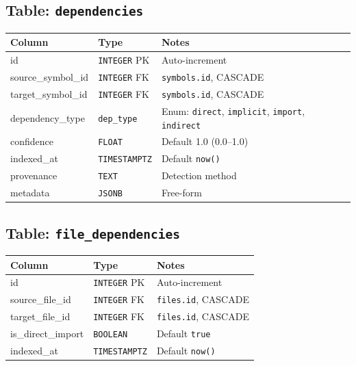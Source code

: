 \subsection{Table: \texttt{dependencies}}

\begin{longtable}{@{}llp{6cm}@{}}
\toprule
\textbf{Column} & \textbf{Type} & \textbf{Notes} \\
\midrule
\endfirsthead
\bottomrule
\endfoot
id                  & \texttt{INTEGER} PK  & Auto-increment \\
source\_symbol\_id  & \texttt{INTEGER} FK  & \texttt{symbols.id}, CASCADE \\
target\_symbol\_id  & \texttt{INTEGER} FK  & \texttt{symbols.id}, CASCADE \\
dependency\_type    & \texttt{dep\_type}    & Enum: \texttt{direct}, \texttt{implicit}, \texttt{import}, \texttt{indirect} \\
confidence          & \texttt{FLOAT}        & Default 1.0 (0.0--1.0) \\
indexed\_at         & \texttt{TIMESTAMPTZ}  & Default \texttt{now()} \\
provenance          & \texttt{TEXT}         & Detection method \\
metadata            & \texttt{JSONB}        & Free-form \\
\end{longtable}

\subsection{Table: \texttt{file\_dependencies}}

\begin{longtable}{@{}llp{6cm}@{}}
\toprule
\textbf{Column} & \textbf{Type} & \textbf{Notes} \\
\midrule
\endfirsthead
\bottomrule
\endfoot
id                & \texttt{INTEGER} PK  & Auto-increment \\
source\_file\_id  & \texttt{INTEGER} FK  & \texttt{files.id}, CASCADE \\
target\_file\_id  & \texttt{INTEGER} FK  & \texttt{files.id}, CASCADE \\
is\_direct\_import& \texttt{BOOLEAN}     & Default \texttt{true} \\
indexed\_at       & \texttt{TIMESTAMPTZ} & Default \texttt{now()} \\
\end{longtable}


